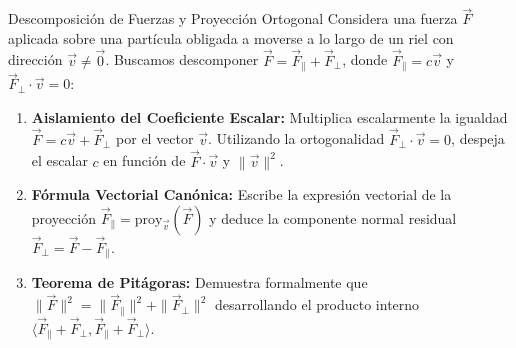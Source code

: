 \documentclass[10pt,aspectratio=169]{beamer}
\begin{document}
\begin{frame}{Descomposición de Fuerzas y Proyección Ortogonal}
  \vspace{0.05cm}
  Considera una fuerza $\vec{F}$ aplicada sobre una partícula obligada a moverse a lo largo de un riel con dirección $\vec{v} \neq \vec{0}$. Buscamos descomponer $\vec{F} = \vec{F}_\parallel + \vec{F}_\perp$, donde $\vec{F}_\parallel = c\vec{v}$ y $\vec{F}_\perp \cdot \vec{v} = 0$:
  \vspace{0.25cm}
  \begin{enumerate}\itemsep10pt
    \item[(a)] \textbf{Aislamiento del Coeficiente Escalar:} Multiplica escalarmente la igualdad $\vec{F} = c\vec{v} + \vec{F}_\perp$ por el vector $\vec{v}$. Utilizando la ortogonalidad $\vec{F}_\perp \cdot \vec{v} = 0$, despeja el escalar $c$ en función de $\vec{F}\cdot\vec{v}$ y $\|\vec{v}\|^2$.
    \item[(b)] \textbf{Fórmula Vectorial Canónica:} Escribe la expresión vectorial de la proyección $\vec{F}_\parallel = \text{proy}_{\vec{v}}(\vec{F})$ y deduce la componente normal residual $\vec{F}_\perp = \vec{F} - \vec{F}_\parallel$.
    \item[(c)] \textbf{Teorema de Pitágoras:} Demuestra formalmente que $\|\vec{F}\|^2 = \|\vec{F}_\parallel\|^2 + \|\vec{F}_\perp\|^2$ desarrollando el producto interno $\langle \vec{F}_\parallel + \vec{F}_\perp, \vec{F}_\parallel + \vec{F}_\perp \rangle$.
  \end{enumerate}
\end{frame}
\end{document}
